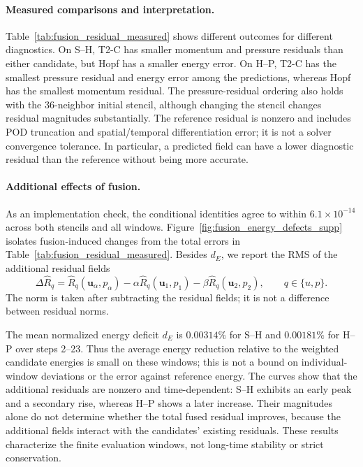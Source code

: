 \paragraph{Measured comparisons and interpretation.}
Table~\ref{tab:fusion_residual_measured} shows different outcomes for
different diagnostics. On S--H, T2-C has smaller momentum and pressure
residuals than either candidate, but Hopf has a smaller energy error.
On H--P, T2-C has the smallest pressure residual and energy error among
the predictions, whereas Hopf has the smallest momentum residual.
The pressure-residual ordering also holds with the 36-neighbor initial
stencil, although changing the stencil changes residual magnitudes
substantially. The reference residual is nonzero and includes POD
truncation and spatial/temporal differentiation error; it is not a solver
convergence tolerance. In particular, a predicted field can have a lower
diagnostic residual than the reference without being more accurate.

\paragraph{Additional effects of fusion.}
As an implementation check, the conditional identities agree to within
$6.1\times10^{-14}$ across both stencils and all windows.
Figure~\ref{fig:fusion_energy_defects_supp} isolates fusion-induced
changes from the total errors in Table~\ref{tab:fusion_residual_measured}.
Besides $d_E$, we report the RMS of the additional residual fields
\begin{equation}
\Delta\widehat R_q
=\widehat R_q(\bm u_\alpha,p_\alpha)
-\alpha\widehat R_q(\bm u_1,p_1)
-\beta\widehat R_q(\bm u_2,p_2),
\qquad q\in\{u,p\}.
\end{equation}
The norm is taken after subtracting the residual fields; it is not
a difference between residual norms.

The mean normalized energy deficit $d_E$ is $0.00314\%$ for S--H and
$0.00181\%$ for H--P over steps 2--23. Thus the average energy reduction
relative to the weighted candidate energies is small on these windows;
this is not a bound on individual-window deviations or the error
against reference energy. The curves show that the additional residuals
are nonzero and time-dependent: S--H exhibits an early peak and a
secondary rise, whereas H--P shows a later increase.
Their magnitudes alone do not determine whether the total fused
residual improves, because the additional fields interact with the
candidates' existing residuals. These results characterize the finite
evaluation windows, not long-time stability or strict conservation.

